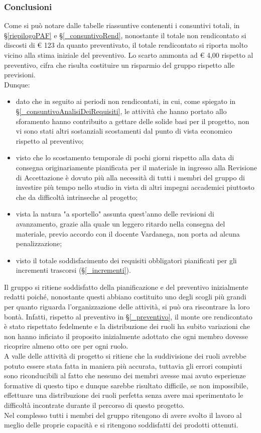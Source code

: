 \subsubsection{Conclusioni}
Come si può notare dalle tabelle riassuntive contenenti i consuntivi totali, in \S\ref{riepilogoPAF} e \S\ref{_consuntivoRend}, nonostante il totale non rendicontato si discosti di € 123 da quanto preventivato, il totale rendicontato si riporta molto vicino alla stima iniziale del preventivo. Lo scarto ammonta ad € 4,00 rispetto al preventivo, cifra che risulta costituire un risparmio del gruppo rispetto alle previsioni. \\
Dunque:
\begin{itemize}
	\item dato che in seguito ai periodi non rendicontati, in cui, come spiegato in \S\ref{_consuntivoAnalisiDeiRequisiti}, le attività che hanno portato allo sforamento hanno contribuito a gettare delle solide basi per il progetto, non vi sono stati altri sostanziali scostamenti dal punto di vista economico rispetto al preventivo;
	\item visto che lo scostamento temporale di pochi giorni rispetto alla data di consegna originariamente pianificata per il materiale in ingresso alla Revisione di Accettazione è dovuto più alla necessità di tutti i membri del gruppo di investire più tempo nello studio in vista di altri impegni accademici piuttosto che da difficoltà intrinseche al progetto;
	\item vista la natura "a sportello" assunta quest'anno delle revisioni di avanzamento, grazie alla quale un leggero ritardo nella consegna del materiale, previo accordo con il docente Vardanega, non porta ad alcuna penalizzazione;  
	\item visto il totale soddisfacimento dei requisiti obbligatori pianificati per gli incrementi trascorsi (\S\ref{_incrementi}).
\end{itemize}
  Il gruppo si ritiene soddisfatto della pianificazione e del preventivo inizialmente redatti poiché, nonostante questi abbiano costituito uno degli scogli più grandi per quanto riguarda l'organizzazione delle attività, si può ora riscontrare la loro bontà. Infatti, rispetto al preventivo in \S\ref{_preventivo}, il monte ore rendicontato è stato rispettato fedelmente e la distribuzione dei ruoli ha subito variazioni che non hanno inficiato il proposito inizialmente adottato che ogni membro dovesse ricoprire almeno otto ore per ogni ruolo. \\
  A valle delle attività di progetto si ritiene che la suddivisione dei ruoli avrebbe potuto essere stata fatta in maniera più accurata, tuttavia gli errori compiuti sono riconducibili al fatto che nessuno dei membri avesse mai avuto esperienze formative di questo tipo e dunque sarebbe risultato difficile, se non impossibile, effettuare una distribuzione dei ruoli perfetta senza avere mai sperimentato le difficoltà incontrate durante il percorso di questo progetto.\\
  Nel complesso tutti i membri del gruppo ritengono di avere svolto il lavoro al meglio delle proprie capacità e si ritengono soddisfatti dei prodotti ottenuti. \\ 

